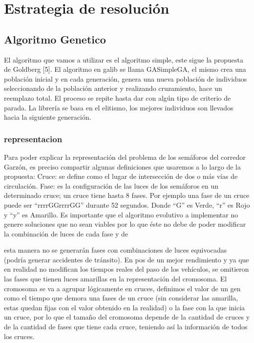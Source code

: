 \chapter{Estrategia de resolución}



\section{Algoritmo Genetico}
El algoritmo que vamos a utilizar es el algoritmo simple, este
sigue  la  propuesta  de  Goldberg  [5].  El  algoritmo  en  galib  se
llama GASimpleGA, el mismo crea una población inicial y en
cada  generación,  genera  una  nueva  población  de  individuos
seleccionando  de  la  población  anterior  y  realizando
cruzamiento,  hace  un  reemplazo  total.  El  proceso  se  repite
hasta  dar  con  algún  tipo  de  criterio  de parada.  La  librería se
basa en el elitismo, los mejores individuos son llevados hacia
la siguiente generación.

\subsection{representacion}
Para poder explicar la representación del problema de los
semáforos del corredor Garzón, es preciso compartir algunas
definiciones que usaremos a lo largo de la propuesta:
Cruce: se define como el lugar de intersección de dos o
más vías de circulación.
Fase: es la configuración de las luces de los semáforos
en un determinado cruce; un cruce tiene hasta 8 fases.
Por ejemplo una fase de un cruce puede ser
“rrrrGGrrrrGG” durante 52 segundos. Donde “G” es
Verde, “r” es Rojo y “y” es Amarillo.  
Es  importante  que  el  algoritmo  evolutivo  a  implementar  no
genere soluciones que no sean viables por lo que éste no debe
de poder modificar la combinación de luces de cada fase y de

esta manera no se generarán fases con combinaciones de luces
equivocadas (podría generar accidentes de tránsito).
En  pos  de  un  mejor  rendimiento  y  ya  que  en  realidad  no
modifican  los  tiempos  reales  del  paso  de  los  vehículos,  se
omitieron  las   fases  que  tienen  luces  amarillas  en  la
representación del cromosoma.
El  cromosoma  se  va  a  agrupar  lógicamente  en  cruces,
definimos el valor de un gen como el tiempo que demora una
fases  de  un  cruce  (sin  considerar  las  amarilla,  estas  quedan
fijas con el valor obtenido en la realidad) o la fase con la que
inicia un cruce, por lo que el tamaño del cromosoma depende
de  la  cantidad  de  cruces  y  de  la  cantidad  de  fases  que  tiene
cada cruce, teniendo así la información de todos los cruces.

